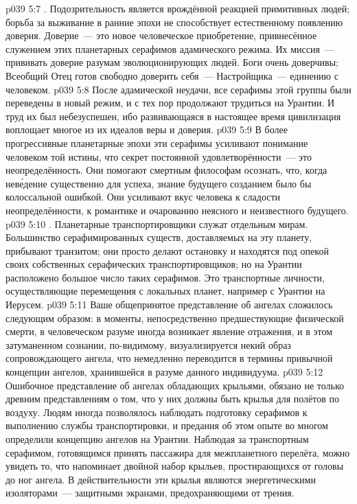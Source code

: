 \vs p039 5:7 . Подозрительность является врождённой реакцией примитивных людей; борьба за выживание в ранние эпохи не способствует естественному появлению доверия. Доверие~--- это новое человеческое приобретение, привнесённое служением этих планетарных серафимов адамического режима. Их миссия~--- прививать доверие разумам эволюционирующих людей. Боги очень доверчивы; Всеобщий Отец готов свободно доверить себя~--- Настройщика~--- единению с человеком.
\vs p039 5:8 После адамической неудачи, все серафимы этой группы были переведены в новый режим, и с тех пор продолжают трудиться на Урантии. И труд их был небезуспешен, ибо развивающаяся в настоящее время цивилизация воплощает многое из их идеалов веры и доверия.
\vs p039 5:9 В более прогрессивные планетарные эпохи эти серафимы усиливают понимание человеком той истины, что секрет постоянной удовлетворённости~--- это неопределённость. Они помогают смертным философам осознать, что, когда нев\'едение существенно для успеха, знание будущего созданием было бы колоссальной ошибкой. Они усиливают вкус человека к сладости неопределённости, к романтике и очарованию неясного и неизвестного будущего.
\vs p039 5:10 . Планетарные транспортировщики служат отдельным мирам. Большинство серафимированных существ, доставляемых на эту планету, прибывают транзитом; они просто делают остановку и находятся под опекой своих собственных серафических транспортировщиков; но на Урантии расположено большое число таких серафимов. Это транспортные личности, осуществляющие перемещения с локальных планет, например с Урантии на Иерусем.
\vs p039 5:11 \pc Ваше общепринятое представление об ангелах сложилось следующим образом: в моменты, непосредственно предшествующие физической смерти, в человеческом разуме иногда возникает явление отражения, и в этом затуманенном сознании, по\hyp{}видимому, визуализируется некий образ сопровождающего ангела, что немедленно переводится в термины привычной концепции ангелов, хранившейся в разуме данного индивидуума.
\vs p039 5:12 Ошибочное представление об ангелах обладающих крыльями, обязано не только древним представлениям о том, что у них должны быть крылья для полётов по воздуху. Людям иногда позволялось наблюдать подготовку серафимов к выполнению службы транспортировки, и предания об этом опыте во многом определили концепцию ангелов на Урантии. Наблюдая за транспортным серафимом, готовящимся принять пассажира для межпланетного перелёта, можно увидеть то, что напоминает двойной набор крыльев, простирающихся от головы до ног ангела. В действительности эти крылья являются энергетическими изоляторами~--- защитными экранами, предохраняющими от трения.
